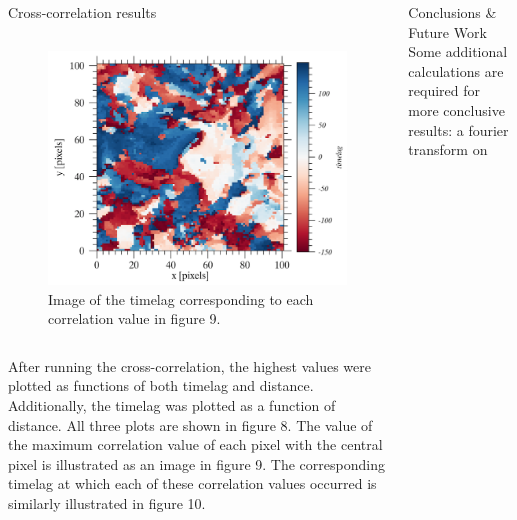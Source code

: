 \documentclass[t]{beamer}
\begin{document}
\begin{frame}[t]
\begin{block}{}
\begin{columns}
\begin{block}{Cross-correlation results}
\begin{columns}
\begin{figure}
                    \includegraphics[width=\textwidth]{tt_color_2.png}
                    \caption{Image of the timelag corresponding to each
                    correlation value in \textcolor{myred}{figure 9}.}
                \end{figure}
            \end{columns}
            \par\vspace{30pt}
            After running the cross-correlation, the highest values were
            plotted as functions of both timelag and distance. Additionally,
            the timelag was plotted as a function of distance. All three plots
            are shown in \textcolor{myred}{figure 8}.
            The value of the maximum correlation value of each pixel with
            the central pixel is illustrated as an image in
            \textcolor{myred}{figure 9}.
            The corresponding timelag at which each of these correlation
            values occurred is similarly illustrated in
            \textcolor{myred}{figure 10}.
        \end{block}
        \begin{columns}
            \begin{block}{Conclusions \& Future Work}
                Some additional calculations are required for more conclusive
                results: a fourier transform on

\end{block}
\end{columns}
\end{columns}
\end{block}
\end{frame}
\end{document}
